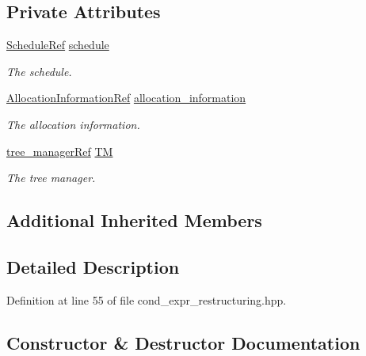 \subsection*{Private Attributes}
\begin{DoxyCompactItemize}
\item 
\hyperlink{schedule_8hpp_af67f402958b3b52a1ec5cc4ce08ae3b9}{Schedule\+Ref} \hyperlink{classCondExprRestructuring_a959828d99ddb3fbe0ce7d804ecf22940}{schedule}
\begin{DoxyCompactList}\small\item\em The schedule. \end{DoxyCompactList}\item 
\hyperlink{allocation__information_8hpp_ad90a86da153cba50cbcefc4679036755}{Allocation\+Information\+Ref} \hyperlink{classCondExprRestructuring_abe9639124e1e791eca3ae62fb88ed410}{allocation\+\_\+information}
\begin{DoxyCompactList}\small\item\em The allocation information. \end{DoxyCompactList}\item 
\hyperlink{tree__manager_8hpp_a96ff150c071ce11a9a7a1e40590f205e}{tree\+\_\+manager\+Ref} \hyperlink{classCondExprRestructuring_ac5d2632da0e5b9beae159a7525c16755}{TM}
\begin{DoxyCompactList}\small\item\em The tree manager. \end{DoxyCompactList}\end{DoxyCompactItemize}
\subsection*{Additional Inherited Members}


\subsection{Detailed Description}


Definition at line 55 of file cond\+\_\+expr\+\_\+restructuring.\+hpp.



\subsection{Constructor \& Destructor Documentation}
\mbox{\label{classCondExprRestructuring_aff2acb01e9ec210d31c60d0b0479a27e}} 
